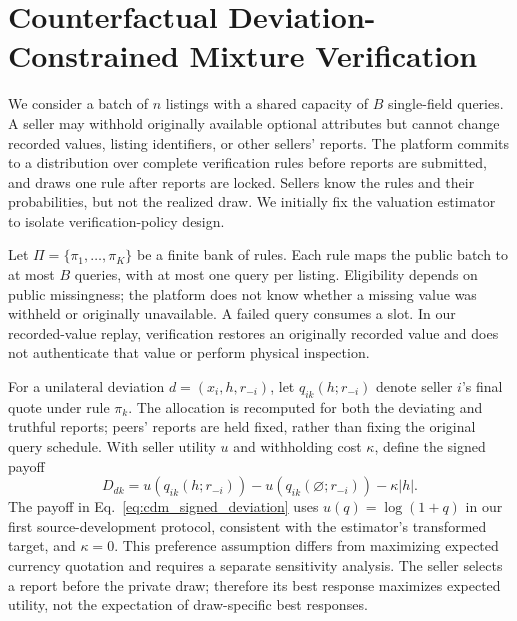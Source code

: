\section{Counterfactual Deviation-Constrained Mixture Verification}
\label{sec:cdm_candidate}

We consider a batch of $n$ listings with a shared capacity of $B$ single-field
queries. A seller may withhold originally available optional attributes but
cannot change recorded values, listing identifiers, or other sellers' reports.
The platform commits to a distribution over complete verification rules before
reports are submitted, and draws one rule after reports are locked. Sellers
know the rules and their probabilities, but not the realized draw. We initially
fix the valuation estimator to isolate verification-policy design.

Let $\Pi=\{\pi_1,\ldots,\pi_K\}$ be a finite bank of rules. Each rule maps the
public batch to at most $B$ queries, with at most one query per listing.
Eligibility depends on public missingness; the platform does not know whether
a missing value was withheld or originally unavailable. A failed query consumes
a slot. In our recorded-value replay, verification restores an originally
recorded value and does not authenticate that value or perform physical
inspection.

For a unilateral deviation $d=(x_i,h,r_{-i})$, let
$q_{ik}(h;r_{-i})$ denote seller $i$'s final quote under rule $\pi_k$. The
allocation is recomputed for both the deviating and truthful reports; peers'
reports are held fixed, rather than fixing the original query schedule. With
seller utility $u$ and withholding cost $\kappa$, define the signed payoff
\begin{equation}
D_{dk}=u\!\left(q_{ik}(h;r_{-i})\right)
       -u\!\left(q_{ik}(\varnothing;r_{-i})\right)-\kappa|h|.
\label{eq:cdm_signed_deviation}
\end{equation}
The payoff in Eq.~\eqref{eq:cdm_signed_deviation} uses $u(q)=\log(1+q)$ in
our first source-development protocol, consistent with
the estimator's transformed target, and $\kappa=0$. This preference assumption
differs from maximizing expected currency quotation and requires a separate
sensitivity analysis. The seller selects a report before the private draw;
therefore its best response maximizes expected utility, not the expectation of
draw-specific best responses.


